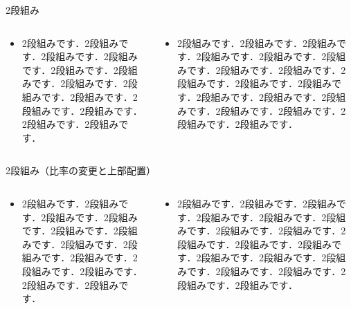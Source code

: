 \begin{frame}{2段組み}
  \begin{columns}
    \begin{column}{0.5\textwidth}
      \begin{itemize}
        \item 2段組みです．2段組みです．2段組みです．2段組みです．2段組みです．2段組みです．2段組みです．2段組みです．2段組みです．2段組みです．2段組みです．2段組みです．2段組みです．
      \end{itemize}
    \end{column}
    \begin{column}{0.5\textwidth}
      \begin{itemize}
        \item 2段組みです．2段組みです．2段組みです．2段組みです．2段組みです．2段組みです．2段組みです．2段組みです．2段組みです．2段組みです．2段組みです．2段組みです．2段組みです．2段組みです．2段組みです．2段組みです．2段組みです．2段組みです．
      \end{itemize}
    \end{column}
  \end{columns}
\end{frame}

\begin{frame}{2段組み（比率の変更と上部配置）}
  \begin{columns}[t]
    \begin{column}{0.3\textwidth}
      \begin{itemize}
        \item 2段組みです．2段組みです．2段組みです．2段組みです．2段組みです．2段組みです．2段組みです．2段組みです．2段組みです．2段組みです．2段組みです．2段組みです．2段組みです．
      \end{itemize}
    \end{column}
    \begin{column}{0.7\textwidth}
      \begin{itemize}
        \item 2段組みです．2段組みです．2段組みです．2段組みです．2段組みです．2段組みです．2段組みです．2段組みです．2段組みです．2段組みです．2段組みです．2段組みです．2段組みです．2段組みです．2段組みです．2段組みです．2段組みです．2段組みです．
      \end{itemize}
    \end{column}
  \end{columns}
\end{frame}

